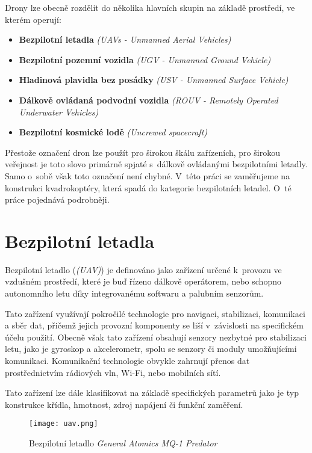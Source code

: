 \documentclass[12pt]{report}
\begin{document}
Drony lze obecně rozdělit do několika hlavních skupin na základě prostředí, ve kterém operují:
\begin{itemize}
	\item \textbf{Bezpilotní letadla} \textit{(UAVs - Unmanned Aerial Vehicles)}
	\item \textbf{Bezpilotní pozemní vozidla} \textit{(UGV - Unmanned Ground Vehicle)}
	\item \textbf{Hladinová plavidla bez posádky} \textit{(USV - Unmanned Surface Vehicle)}
	\item \textbf{Dálkově ovládaná podvodní vozidla} \textit{(ROUV - Remotely Operated Underwater Vehicles)}
	\item \textbf{Bezpilotní kosmické lodě} \textit{(Uncrewed spacecraft)}
\end{itemize}

Přestože označení dron lze použít pro širokou škálu zařízeních, pro širokou veřejnost je toto slovo primárně spjaté s~dálkově ovládanými bezpilotními letadly. Samo o~sobě však toto označení není chybné. V~této práci se zaměřujeme na konstrukci kvadrokoptéry, která spadá do kategorie bezpilotních letadel. O~té práce pojednává podrobněji. \cite{mainbook}

\section[Bezpilotní letadla]{Bezpilotní letadla}
Bezpilotní letadlo (\textit{(UAV)}) je definováno jako zařízení určené k~provozu ve vzdušném prostředí, které je buď řízeno dálkově operátorem, nebo schopno autonomního letu díky integrovanému softwaru a palubním senzorům.

Tato zařízení využívají pokročilé technologie pro navigaci, stabilizaci, komunikaci a sběr dat, přičemž jejich provozní komponenty se liší v~závislosti na specifickém účelu použití. Obecně však tato zařízení obsahují senzory nezbytné pro stabilizaci letu, jako je gyroskop a akcelerometr, spolu se senzory či moduly umožňujícími komunikaci. Komunikační technologie obvykle zahrnují přenos dat prostřednictvím rádiových vln, Wi-Fi, nebo mobilních sítí.

Tato zařízení lze dále klasifikovat na základě specifických parametrů jako je typ konstrukce křídla, hmotnost, zdroj napájení či funkční zaměření.

\begin{figure}[H]
	\centering
	\texttt{[image: uav.png]}
	\caption{Bezpilotní letadlo \textit{General Atomics MQ-1 Predator} \cite{mainbook}}
	\label{fig:uav.png}
  \end{figure}
\end{document}
